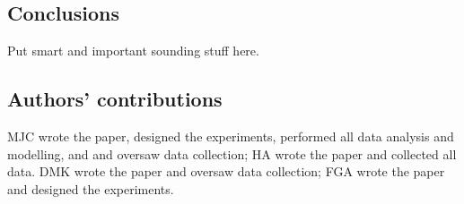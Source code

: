 \documentclass[doc, floatsintext]{apa7}
\begin{document}
\subsection{Conclusions}
Put smart and important sounding stuff here.

\subsection{Authors' contributions}
MJC wrote the paper, designed the experiments, performed all
data analysis and modelling, and and oversaw data
collection;
HA wrote the paper and collected all data.
DMK wrote the paper and oversaw data collection;
FGA wrote the paper and designed the experiments.

\printbibliography
\end{document}
